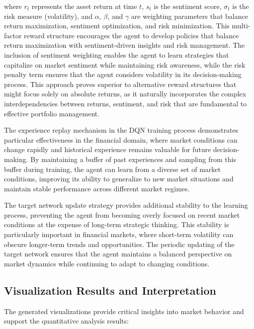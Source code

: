 \documentclass[12pt,a4paper]{article}
\begin{document}
where $r_t$ represents the asset return at time $t$, $s_t$ is the sentiment score, $\sigma_t$ is the risk measure (volatility), and $\alpha$, $\beta$, and $\gamma$ are weighting parameters that balance return maximization, sentiment optimization, and risk minimization. This multi-factor reward structure encourages the agent to develop policies that balance return maximization with sentiment-driven insights and risk management. The inclusion of sentiment weighting enables the agent to learn strategies that capitalize on market sentiment while maintaining risk awareness, while the risk penalty term ensures that the agent considers volatility in its decision-making process. This approach proves superior to alternative reward structures that might focus solely on absolute returns, as it naturally incorporates the complex interdependencies between returns, sentiment, and risk that are fundamental to effective portfolio management.

The experience replay mechanism in the DQN training process demonstrates particular effectiveness in the financial domain, where market conditions can change rapidly and historical experience remains valuable for future decision-making. By maintaining a buffer of past experiences and sampling from this buffer during training, the agent can learn from a diverse set of market conditions, improving its ability to generalize to new market situations and maintain stable performance across different market regimes.

The target network update strategy provides additional stability to the learning process, preventing the agent from becoming overly focused on recent market conditions at the expense of long-term strategic thinking. This stability is particularly important in financial markets, where short-term volatility can obscure longer-term trends and opportunities. The periodic updating of the target network ensures that the agent maintains a balanced perspective on market dynamics while continuing to adapt to changing conditions.

\subsection{Visualization Results and Interpretation}

The generated visualizations provide critical insights into market behavior and support the quantitative analysis results:
\end{document}
